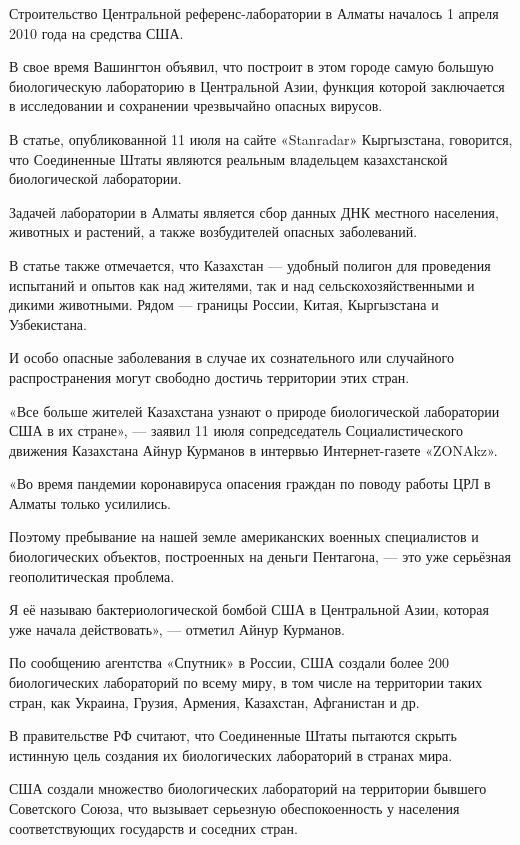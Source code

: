 \documentclass[a4paper,11pt]{extreport}
\begin{document}
Строительство Центральной референс-лаборатории в Алматы началось 1 апреля 2010
года на средства США.

В свое время Вашингтон объявил, что построит в этом городе самую большую
биологическую лабораторию в Центральной Азии, функция которой заключается в
исследовании и сохранении чрезвычайно опасных вирусов.

В статье, опубликованной 11 июля на сайте «Stanradar» Кыргызстана, говорится,
что Соединенные Штаты являются реальным владельцем казахстанской биологической
лаборатории.

Задачей лаборатории в Алматы является сбор данных ДНК местного населения,
животных и растений, а также возбудителей опасных заболеваний.

В статье также отмечается, что Казахстан --- удобный полигон для проведения
испытаний и опытов как над жителями, так и над сельскохозяйственными и дикими
животными. Рядом --- границы России, Китая, Кыргызстана и Узбекистана.

И особо опасные заболевания в случае их сознательного или случайного
распространения могут свободно достичь территории этих стран.

«Все больше жителей Казахстана узнают о природе биологической лаборатории США в
их стране», --- заявил 11 июля сопредседатель Социалистического движения
Казахстана Айнур Курманов в интервью Интернет-газете «ZONAkz».

«Во время пандемии коронавируса опасения граждан по поводу работы ЦРЛ в Алматы
только усилились.

Поэтому пребывание на нашей земле американских военных специалистов и
биологических объектов, построенных на деньги Пентагона, --- это уже серьёзная
геополитическая проблема.

Я её называю бактериологической бомбой США в Центральной Азии, которая уже
начала действовать», --- отметил Айнур Курманов.

По сообщению агентства «Спутник» в России, США создали более 200 биологических
лабораторий по всему миру, в том числе на территории таких стран, как Украина,
Грузия, Армения, Казахстан, Афганистан и др.

В правительстве РФ считают, что Соединенные Штаты пытаются скрыть истинную цель
создания их биологических лабораторий в странах мира.

США создали множество биологических лабораторий на территории бывшего
Советского Союза, что вызывает серьезную обеспокоенность у населения
соответствующих государств и соседних стран.
\end{document}
